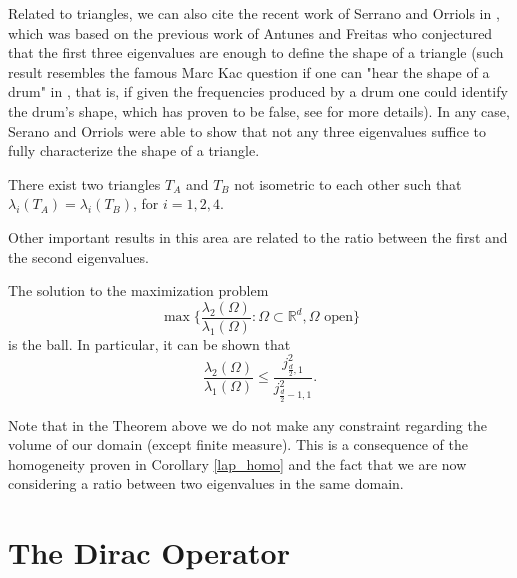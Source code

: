 Related to triangles, we can also cite the recent work of Serrano and Orriols in \cite{gomez2021any}, which was based on the previous work of Antunes and Freitas \cite{antunes2011inverse} who conjectured that the first three eigenvalues are enough to define the shape of a triangle (such result resembles the famous Marc Kac question if one can "hear the shape of a drum" in \cite{kac1966can}, that is, if given the frequencies produced by a drum one could identify the drum's shape, which has proven to be false, see \cite{gordon1992isospectral} for more details). In any case, Serano and Orriols were able to show that not any three eigenvalues suffice to fully characterize the shape of a triangle.
\begin{theorem}
    There exist two triangles \(T_A\) and \(T_B\) not isometric to each other such that \(\lambda_i(T_A) = \lambda_i(T_B)\), for \(i=1, 2, 4\).    
\end{theorem}

Other important results in this area are related to the ratio between the first and the second eigenvalues.
\begin{theorem}\label{ashbaugh-benguria theorem}
    The solution to the maximization problem
    \[
    \max \Big\{\frac{\lambda_2(\Omega)}{\lambda_1(\Omega)}: \Omega \subset \mathbb{R}^d, \Omega \text{ open} \Big\}
    \]
    is the ball. In particular, it can be shown that
    \[
    \frac{\lambda_2(\Omega)}{\lambda_1(\Omega)}  \leq \frac{j_{\frac{d}{2},1}^2}{j_{\frac{d}{2}-1,1}^2}.
    \]
\end{theorem}

\begin{remark}
    Note that in the Theorem above we do not make any constraint regarding the volume of our domain (except finite measure). This is a consequence of the homogeneity proven in Corollary \eqref{lap_homo} and the fact that we are now considering a ratio between two eigenvalues in the same domain.
\end{remark}


\section{The Dirac Operator}
 
